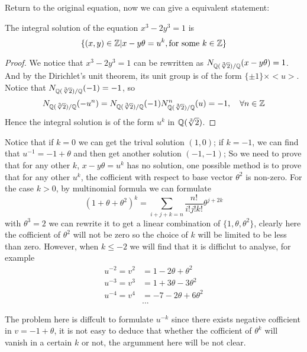 Return to the original equation, now we can give a equivalent statement:
\begin{proposition}
    The integral solution of the equation \(x^3-2y^3=1\) is
    \[\{(x,y)\in \mathbb{Z}| x-y\theta = u^k, \text{for some } k \in \mathbb{Z}\}\]

    \begin{proof}
        We notice that \(x^3-2y^3 = 1 \) can be rewritten as \(N_{\mathbb{Q}(\sqrt[3]{2}) / \mathbb{Q}}(x-y\theta) = 1\). And by the Dirichlet's unit theorem, its unit group is of the form \(\{\pm 1\} \times <u>\). Notice that \(N_{\mathbb{Q}(\sqrt[3]{2}) / \mathbb{Q}}(-1) = -1\), so
        \[N_{\mathbb{Q}(\sqrt[3]{2}) / \mathbb{Q}}(-u^n) = N_{\mathbb{Q}(\sqrt[3]{2}) / \mathbb{Q}}(-1)N_{\mathbb{Q}(\sqrt[3]{2}) / \mathbb{Q}}^n(u) = -1, \quad \forall n \in \mathbb{Z} \]
        Hence the integral solution is of the form \(u^k\) in \(\mathbb{Q}(\sqrt[3]{2})\).
    \end{proof}
\end{proposition}

Notice that if \(k=0\) we can get the trival solution \((1,0)\); if \(k=-1\), we can find that \(u^{-1} = -1 + \theta\) and then get another solution \((-1,-1)\); So we need to prove that for any other \(k\), \(x-y\theta = u^k\) has no solution, one possible method is to prove that for any other \(u^k\), the cofficient with respect to base vector \(\theta^2\) is non-zero. For the case \(k>0\), by multinomial formula we can formulate
\[(1+\theta+ \theta^2)^k = \sum_{i+j+k=n} \frac{n!}{i!j!k!}\theta ^{j+2k}\]
with \(\theta ^3= 2\) we can rewrite it to get a linear combination of \(\{1,\theta,\theta ^2\}\), clearly here the cofficient of \(\theta ^2\) will not be zero so the choice of \(k\) will be limited to be less than zero. However, when \(k\leq -2\) we will find that it is difficlut to analyse, for example
\begin{align*}
    u^{-2} = v^2 &= 1- 2\theta +\theta^2 \\
    u^{-3} = v^3 &= 1+3\theta-3\theta^2 \\
    u^{-4} = v^4 &= -7-2\theta+6\theta^2\\
    &...
\end{align*}

The problem here is diffcult to formulate \(u^{-k}\) since there exists negative cofficient in \(v=-1+\theta\), it is not easy to deduce that whether the cofficient of \(\theta^k\) will vanish in a certain \(k\) or not, the argumment here will be not clear.